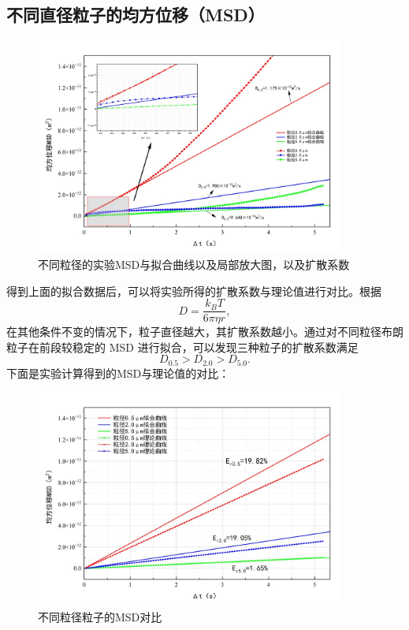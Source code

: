 \documentclass[a4paper]{report} %
\begin{document}
\subsection{不同直径粒子的均方位移（MSD）}
\begin{figure}[htbp]
  \centering
  \includegraphics[width=0.9\textwidth]{实验数据拟合1.jpg}
  \caption{不同粒径的实验MSD与拟合曲线以及局部放大图，以及扩散系数}
  \label{fig:fit1}
\end{figure}
得到上面的拟合数据后，可以将实验所得的扩散系数与理论值进行对比。根据
\begin{equation}
    D = \frac{k_B T}{6 \pi \eta r},
\end{equation}
在其他条件不变的情况下，粒子直径越大，其扩散系数越小。通过对不同粒径布朗粒子在前段较稳定的 MSD 进行拟合，可以发现三种粒子的扩散系数满足
\[
    D_{0.5} > D_{2.0} > D_{5.0}.
\]
下面是实验计算得到的MSD与理论值的对比：
\begin{figure}[htbp]
  \centering
  \includegraphics[width=0.9\textwidth]{对比1.jpg}
  \caption{不同粒径粒子的MSD对比}
  \label{fig:fitall1}
\end{figure}
\newpage
\end{document}
